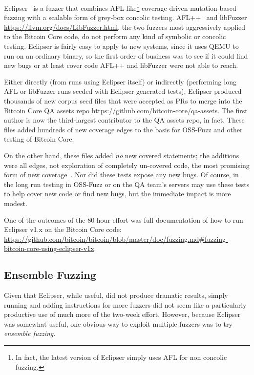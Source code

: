 \begin{sloppypar}
Eclipser~\cite{eclipser} is a fuzzer that combines AFL-like\footnote{In fact, the latest version of Eclipser simply uses AFL for non concolic fuzzing.} coverage-driven mutation-based fuzzing with a scalable form of grey-box concolic testing.  AFL++~\cite{AFLplusplus-Woot20} and libFuzzer \url{https://llvm.org/docs/LibFuzzer.html}, the two fuzzers most aggressively applied to the Bitcoin Core code, do not perform any kind of symbolic or concolic testing.  Eclipser is fairly easy to apply to new systems, since it uses QEMU to run on an ordinary binary, so the first order of business was to see if it could find new bugs or at least cover code AFL++ and libFuzzer were not able to reach.

Either directly (from runs using Eclipser itself) or indirectly (performing long AFL or libFuzzer runs seeded with Eclipser-generated tests), Eclipser produced thousands of new corpus seed files that were accepted as PRs to merge into the Bitcoin Core QA assets repo \url{https://github.com/bitcoin-core/qa-assets}.  The first author is now the third-largest contributor to the QA assets repo, in fact.  These files added hundreds of new coverage edges to the basis for OSS-Fuzz and other testing of Bitcoin Core.

On the other hand, these files added \emph{no} new covered statements; the additions were all edges, not exploration of completely un-covered code, the most promising form of new coverage~\cite{covdev,testedness}.  Nor did these tests expose any new bugs.  Of course, in the long run testing in OSS-Fuzz or on the QA team's servers may use these tests to help cover new code or find new bugs, but the immediate impact is more modest.

  One of the outcomes of the 80 hour effort was full documentation of how to run Eclipser v1.x on the Bitcoin Core code:  \url{https://github.com/bitcoin/bitcoin/blob/master/doc/fuzzing.md#fuzzing-bitcoin-core-using-eclipser-v1x}.
\end{sloppypar}

\subsection{Ensemble Fuzzing}

Given that Eclipser, while useful, did not produce dramatic results, simply running and adding instructions for more fuzzers did not seem like a particularly productive use of much more of the two-week effort.  However, because Eclipser was somewhat useful, one obvious way to exploit multiple fuzzers was to try \emph{ensemble fuzzing}.

